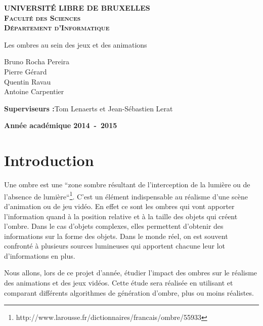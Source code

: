 \documentclass[a4paper,10pt]{report}
\begin{document}
\begin{titlepage}
\begin{center}
\textbf{\textsc{UNIVERSIT\'E LIBRE DE BRUXELLES}}\\
\textbf{\textsc{Faculté des Sciences}}\\
\textbf{\textsc{Département d'Informatique}}
\vfill{}\vfill{}
\begin{center}{\Huge Les ombres au sein des jeux et des animations}\end{center}{\Huge \par}
\begin{center}{\large Bruno Rocha Pereira\\ Pierre Gérard\\ Quentin Ravau\\ Antoine Carpentier}\end{center}{\Huge \par}
\vfill{}\vfill{}
\begin{flushleft}{\large \textbf{Superviseurs :}}\hfill{Tom Lenaerts et Jean-Sébastien Lerat}\end{flushleft}{\large\par}
\vfill{}\vfill{}\enlargethispage{3cm}
\textbf{Année académique 2014~-~2015}
\end{center}
\end{titlepage}



\tableofcontents


\chapter{Introduction}

Une ombre est une ``zone sombre résultant de l'interception de la lumière ou de l'absence de lumière``\footnote{http://www.larousse.fr/dictionnaires/francais/ombre/55933}. C'est un élément indispensable au réalisme d'une scène d'animation ou de jeu vidéo. En effet ce sont les ombres qui vont apporter l'information quand à la position relative et à la taille des objets qui créent l'ombre. Dans le cas d'objets complexes, elles permettent d'obtenir des informations sur la forme des objets.
Dans le monde réel, on est souvent confronté à plusieurs sources lumineuses qui apportent chacune leur lot d'informations en plus.


Nous allons, lors de ce projet d'année, étudier l'impact des ombres sur le réalisme des animations et des jeux vidéos. Cette étude sera réalisée en utilisant et comparant différents algorithmes de génération d'ombre, plus ou moins réalistes.
\end{document}
